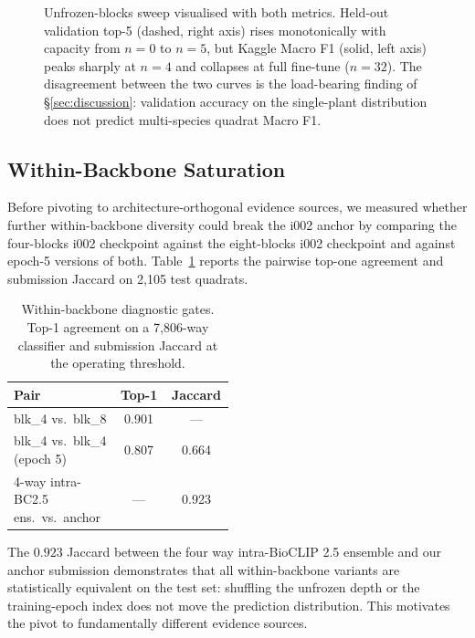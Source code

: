 \documentclass[sigconf]{ceurart}
\begin{document}
\begin{figure}[!htbp]
  \centering
  
  \caption{Unfrozen-blocks sweep visualised with both metrics. Held-out validation top-5 (dashed, right axis) rises monotonically with capacity from $n{=}0$ to $n{=}5$, but Kaggle Macro F1 (solid, left axis) peaks sharply at $n{=}4$ and collapses at full fine-tune ($n{=}32$). The disagreement between the two curves is the load-bearing finding of \S\ref{sec:discussion}: validation accuracy on the single-plant distribution does not predict multi-species quadrat Macro F1.}
  \label{fig:unfreeze_sweep}
\end{figure}
\subsection{Within-Backbone Saturation}
\label{sec:within_backbone}
Before pivoting to architecture-orthogonal evidence sources, we measured whether further within-backbone diversity could break the i002 anchor by comparing the four-blocks i002 checkpoint against the eight-blocks i002 checkpoint and against epoch-5 versions of both. Table~\ref{tab:within} reports the pairwise top-one agreement and submission Jaccard on 2{,}105 test quadrats.
\begin{table}[ht]
\centering
\small
\setlength{\tabcolsep}{2pt}
\begin{tabular}{@{}p{0.48\linewidth}cc@{}}
\toprule
Pair & Top-1 & Jaccard \\
\midrule
blk\_4 vs.\ blk\_8 & 0.901 & --- \\
blk\_4 vs.\ blk\_4 (epoch 5) & 0.807 & 0.664 \\
4-way intra-BC2.5 ens.\ vs.\ anchor & --- & 0.923 \\
\bottomrule
\end{tabular}
\caption{Within-backbone diagnostic gates. Top-1 agreement on a 7{,}806-way classifier and submission Jaccard at the operating threshold.}
\label{tab:within}
\end{table}
The $0.923$ Jaccard between the four way intra-BioCLIP 2.5 ensemble and our anchor submission demonstrates that all within-backbone variants are statistically equivalent on the test set: shuffling the unfrozen depth or the training-epoch index does not move the prediction distribution. This motivates the pivot to fundamentally different evidence sources.
\end{document}
